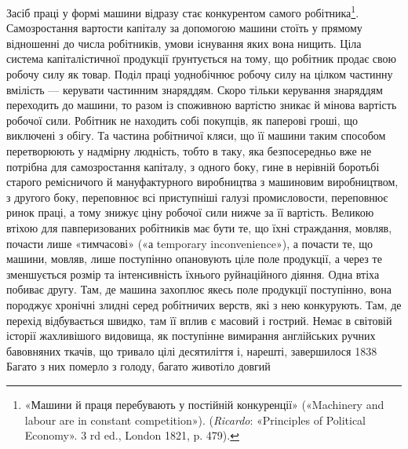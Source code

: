 Засіб праці у формі машини відразу стає конкурентом самого
робітника\footnote{
«Машини й праця перебувають у постійній конкуренції» («Machinery
and labour are in constant competition»). (\emph{Ricardo}: «Principles of
Political Economy». 3 rd ed., London 1821, p. 479).
}. Самозростання вартости капіталу за допомогою
машини стоїть у прямому відношенні до числа робітників, умови
існування яких вона нищить. Ціла система капіталістичної продукції
ґрунтується на тому, що робітник продає свою робочу силу
як товар. Поділ праці уоднобічнює робочу силу на цілком частинну
вмілість — керувати частинним знаряддям. Скоро тільки
керування знаряддям переходить до машини, то разом із споживною
вартістю зникає й мінова вартість робочої сили. Робітник не
находить собі покупців, як паперові гроші, що виключені з обігу.
Та частина робітничої кляси, що її машини таким способом перетворюють
у надмірну людність, тобто в таку, яка безпосередньо
вже не потрібна для самозростання капіталу, з одного боку, гине
в нерівній боротьбі старого ремісничого й мануфактурного виробництва
з машиновим виробництвом, з другого боку, переповнює
всі приступніші галузі промисловости, переповнює ринок праці,
а тому знижує ціну робочої сили нижче за її вартість. Великою
втіхою для павперизованих робітників має бути те, що їхні страждання,
мовляв, почасти лише «тимчасові» («а temporary inconvenience»),
а почасти те, що машини, мовляв, лише поступінно
опановують ціле поле продукції, а через те зменшується розмір
та інтенсивність їхнього руйнаційного діяння. Одна втіха побиває
другу. Там, де машина захоплює якесь поле продукції поступінно,
вона породжує хронічні злидні серед робітничих верств, які з
нею конкурують. Там, де перехід відбувається швидко, там її
 вплив є масовий і гострий. Немає в світовій історії жахливішого
видовища, як поступінне вимирання англійських ручних бавовняних
ткачів, що тривало цілі десятиліття і, нарешті, завершилося
1838~ Багато з них померло з голоду, багато животіло довгий
